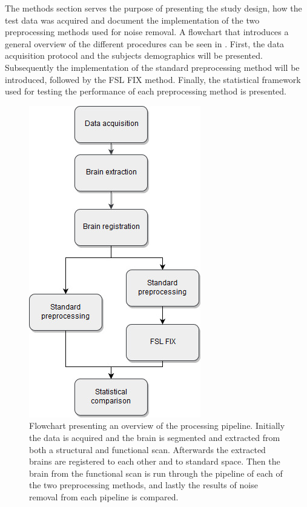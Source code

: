 
The methods section serves the purpose of presenting the study design, how the test data was acquired and document the implementation of the two preprocessing methods used for noise removal. A flowchart that introduces a general overview of the different procedures can be seen in . First, the data acquisition protocol and the subjects demographics will be presented. Subsequently the implementation of the standard preprocessing method will be introduced, followed by the FSL FIX method. Finally, the statistical framework used for testing the performance of each preprocessing method is presented. 

\begin{figure}[H]                 
	\includegraphics[width=.37\textwidth]{figures/bMethods/Flowchart_intro}  
	\caption{Flowchart presenting an overview of the processing pipeline. Initially the data is acquired and the brain is segmented and extracted from both a structural and functional scan. Afterwards the extracted brains are registered to each other and to standard space. Then the brain from the functional scan is run through the pipeline of each of the two preprocessing methods, and lastly the results of noise removal from each pipeline is compared.}
	\label{fig:meth:overview} 
\end{figure}
 